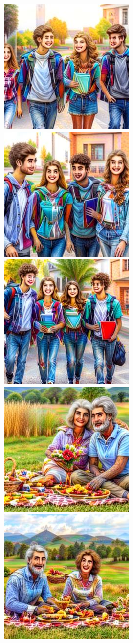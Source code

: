 \begin{figure}[h!]
\begin{subfigure}[t]{0.32\linewidth}
    	\includegraphics[width=0.32\linewidth]{figs/samples_appendix_4/draft1k_cfg_2_ode_prompt_35_image_0.jpg}\;%
    	\includegraphics[width=0.32\linewidth]{figs/samples_appendix_4/draft1k_cfg_2_ode_prompt_35_image_1.jpg}\;%
    	\includegraphics[width=0.32\linewidth]{figs/samples_appendix_4/draft1k_cfg_2_ode_prompt_35_image_2.jpg}\\ 
    	\includegraphics[width=0.32\linewidth]{figs/samples_appendix_4/draft1k_cfg_2_ode_prompt_51_image_0.jpg}\;%
    	\includegraphics[width=0.32\linewidth]{figs/samples_appendix_4/draft1k_cfg_2_ode_prompt_51_image_1.jpg}\;%

\end{subfigure}
\end{figure}
